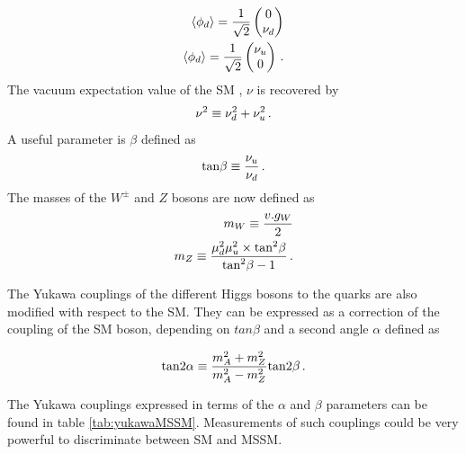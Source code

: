 \begin{align}
    \langle \phi_d \rangle = \frac{1}{\sqrt{2}} \begin{pmatrix} 0 \\ \nu_d \end{pmatrix} \\
    \langle \phi_d \rangle = \frac{1}{\sqrt{2}} \begin{pmatrix} \nu_u \\ 0 \end{pmatrix} \mend
\end{align}
The vacuum expectation value of the SM , $\nu$ is recovered by
\begin{equation}
    \nu^2 \equiv \nu_{d}^2 + \nu_{u}^2 \mend
\end{equation}
A useful parameter is $\beta$ defined as 
\begin{equation}
    \mathrm{tan} \beta \equiv \frac{\nu_u}{\nu_d} \mend
\end{equation}
The masses of the $W^{\pm}$ and $Z$ bosons are now defined as 
\begin{align}
    m_W \equiv \frac{v.g_W}{2} \\
    m_Z \equiv \frac{\mu_{d}^2 \mu_{u}^2 \times \mathrm{tan}^2 \beta}{\mathrm{tan}^2 \beta - 1} \mend
\end{align}

The Yukawa couplings of the different Higgs bosons to the quarks are also modified with respect to the SM. They can be expressed as a correction of the coupling of the SM boson, depending on $tan \beta$ and a second angle $\alpha$ defined as 

\begin{equation}
    \mathrm{tan} 2\alpha \equiv \frac{m_{A}^2 + m_{Z}^2}{m_{A}^2 - m_{Z}^2} \mathrm{tan}2\beta \mend
\end{equation}

The Yukawa couplings expressed in terms of the $\alpha$ and $\beta$ parameters can be found in table \ref{tab:yukawaMSSM}. Measurements of such couplings could be very powerful to discriminate between SM and MSSM.

